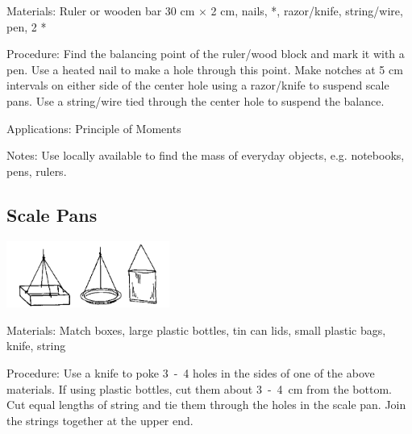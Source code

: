 \begin{multicols}{2}
\begin{description*}
\item[Materials:]{Ruler or wooden bar 30 cm $\times$ 2 cm, nails, *, razor/knife, string/wire, pen, 2 *}
\item[Procedure:]{Find the balancing point of the ruler/wood block and mark it with a pen. Use a heated nail to make a hole through this point. Make notches at 5 cm intervals on either side of the center hole using a razor/knife to suspend scale pans. Use a string/wire tied through the center hole to suspend the balance.}
\item[Applications:]{Principle of Moments}
\item[Notes:]{Use locally available  to find the mass of everyday objects, e.g. notebooks, pens, rulers.}
\end{description*}

\subsection{Scale Pans}
\label{sub:scalepans}

\begin{center}
\includegraphics[width=0.4\textwidth]{./img/source/scale-pans.png}
\end{center}

\begin{description*}
\item[Materials:]{Match boxes, large plastic bottles, tin can lids, small plastic bags, knife, string}
\item[Procedure:]{Use a knife to poke 3~-~4 holes in the sides of one of the above materials. If using plastic bottles, cut them about 3~-~4~cm from the bottom. Cut equal lengths of string and tie them through the holes in the scale pan. Join the strings together at the upper end. }
\end{description*}


\end{multicols}
